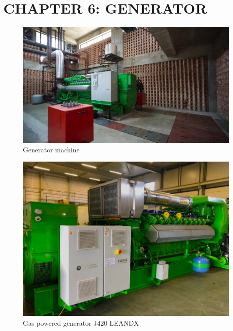 \section{CHAPTER 6: GENERATOR}
\begin{figure}[h!]
    \centering
    \includegraphics[width=1\linewidth]{figs/generator.jpg}
    \caption{Generator machine}
    \label{fig:generator}
\end{figure}

\begin{figure}
    \centering
    \includegraphics[width=1\linewidth]{figs/gas_gen_j420_leandx.png}
    \caption{Gas powered generator J420 LEANDX}
    \label{fig:gas_gen}
\end{figure}